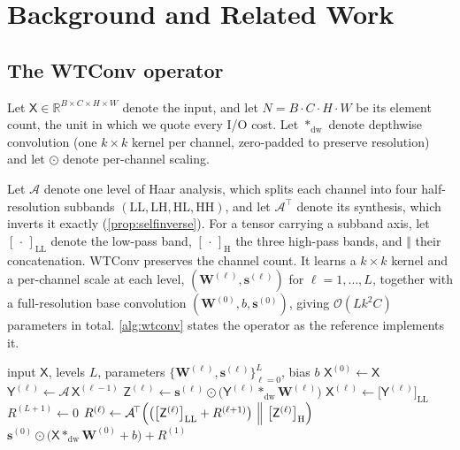 \documentclass[10pt]{article} %
\newcommand{\tX}{\mathsf{X}}
\newcommand{\tY}{\mathsf{Y}}
\newcommand{\tZ}{\mathsf{Z}}
\newcommand{\mW}{\mathbf{W}}
\newcommand{\vs}{\mathbf{s}}
\newcommand{\Aop}{\mathcal{A}}          %
\newcommand{\dwconv}{\mathbin{\ast_{\mathrm{dw}}}}
\theoremstyle{plain}
\begin{document}
\section{Background and Related Work}
\label{sec:background}

\subsection{The WTConv operator}

Let $\tX\in\mathbb{R}^{B\times C\times H\times W}$ denote the input, and let $N=B\cdot C\cdot H\cdot W$ be its element count, the unit in which we quote every I/O cost. Let $\dwconv$ denote depthwise convolution (one $k\times k$ kernel per channel, zero-padded to preserve resolution) and let $\odot$ denote per-channel scaling.

Let $\Aop$ denote one level of Haar analysis, which splits each channel into four half-resolution subbands $(\mathrm{LL},\mathrm{LH},\mathrm{HL},\mathrm{HH})$, and let $\Aop^{\!\top}$ denote its synthesis, which inverts it exactly (\autoref{prop:selfinverse}). For a tensor carrying a subband axis, let $[\,\cdot\,]_{\mathrm{LL}}$ denote the low-pass band, $[\,\cdot\,]_{\mathrm{H}}$ the three high-pass bands, and $\Vert$ their concatenation. WTConv preserves the channel count. It learns a $k\times k$ kernel and a per-channel scale at each level, $(\mW^{(\ell)},\vs^{(\ell)})$ for $\ell=1,\dots,L$, together with a full-resolution base convolution $(\mW^{(0)},b,\vs^{(0)})$, giving $\mathcal{O}(Lk^2C)$ parameters in total. \autoref{alg:wtconv} states the operator as the reference implements it.

\begin{algorithm}[!ht]
\caption{WTConv, reference implementation \citep{finder2024wavelet}}
\label{alg:wtconv}
\begin{algorithmic}[1]
\Require input $\tX$, levels $L$, parameters $\{\mW^{(\ell)},\vs^{(\ell)}\}_{\ell=0}^{L}$, bias $b$
\State $\tX^{(0)} \gets \tX$ 
 
  \State $\tY^{(\ell)} \gets \Aop\,\tX^{(\ell-1)}$ 
  \State $\tZ^{(\ell)} \gets \vs^{(\ell)}\odot\bigl(\tY^{(\ell)}\dwconv\mW^{(\ell)}\bigr)$ 
  \State $\tX^{(\ell)} \gets \bigl[\tY^{(\ell)}\bigr]_{\mathrm{LL}}$ 
\EndFor
\State $R^{(L+1)} \gets 0$
 
  \State $R^{(\ell)} \gets \Aop^{\!\top}\Bigl(\bigl(\bigl[\tZ^{(\ell)}\bigr]_{\mathrm{LL}} + R^{(\ell+1)}\bigr)\ \Big\Vert\ \bigl[\tZ^{(\ell)}\bigr]_{\mathrm{H}}\Bigr)$
\EndFor
\State \Return $\vs^{(0)}\odot\bigl(\tX\dwconv\mW^{(0)} + b\bigr) + R^{(1)}$ 
\end{algorithmic}
\end{algorithm}
\end{document}
